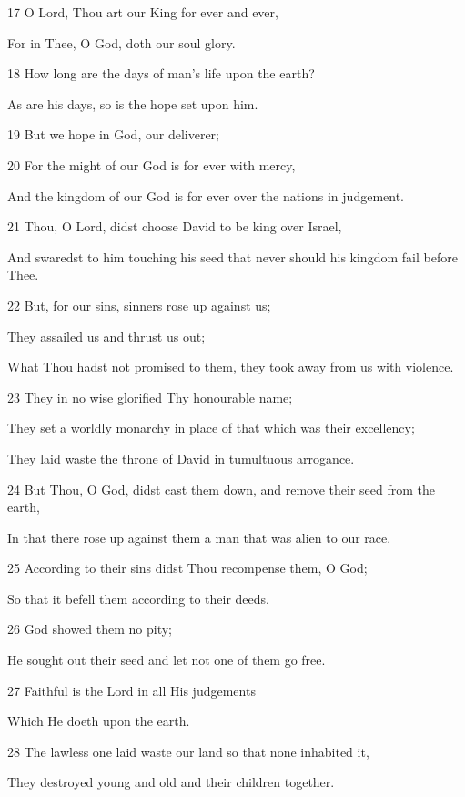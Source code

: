 \par 17 O Lord, Thou art our King for ever and ever,
\par  For in Thee, O God, doth our soul glory.
\par 18 How long are the days of man's life upon the earth?
\par  As are his days, so is the hope set upon him.
\par 19 But we hope in God, our deliverer;
\par 20 For the might of our God is for ever with mercy,
\par  And the kingdom of our God is for ever over the nations in judgement.
\par    
\par 21 Thou, O Lord, didst choose David to be king over Israel,
\par  And swaredst to him touching his seed that never should his kingdom fail before Thee.
\par 22 But, for our sins, sinners rose up against us;
\par  They assailed us and thrust us out;
\par  What Thou hadst not promised to them, they took away from us with violence.
\par 23 They in no wise glorified Thy honourable name;
\par  They set a worldly monarchy in place of that which was their excellency;
\par  They laid waste the throne of David in tumultuous arrogance.
\par 24 But Thou, O God, didst cast them down, and remove their seed from the earth,
\par  In that there rose up against them a man that was alien to our race.
\par 25 According to their sins didst Thou recompense them, O God;
\par  So that it befell them according to their deeds.
\par 26 God showed them no pity;
\par  He sought out their seed and let not one of them go free.
\par 27 Faithful is the Lord in all His judgements
\par  Which He doeth upon the earth.
\par    
\par 28 The lawless one laid waste our land so that none inhabited it,
\par  They destroyed young and old and their children together.
